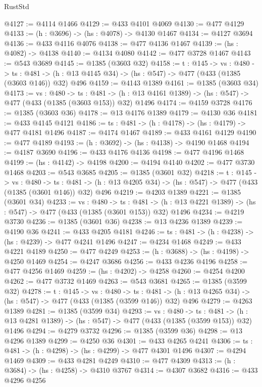 \begin{lexlean}{RustStd}
\begin{coremodule}
@4127 := @4114 @1466
@4129 := @433 @4101 @4069
@4130 := @477 @4129
@4133 := (h : @3696) -> (hs : @4078) -> @4130 @1467
@4134 := @4127 @3694
@4136 := @433 @4116 @4076
@4138 := @477 @4136 @1467
@4139 := (hs : @4082) -> @4138
@4140 := @4134 @4080
@4142 := @477 @3728 @1467
@4143 := @543 @3689
@4145 := @1385 (@3603 @32)
@4158 := {t : @145} ->
  {vs : @480} ->
  {ts : @481} -> (h : @13 @4145 @34) -> (hs : @547) -> @477 (@433 (@1385 (@3603 @146)) @32) @496
@4159 := @4143 @1389
@4161 := @1385 (@3603 @34)
@4173 := {vs : @480} ->
  {ts : @481} -> (h : @13 @4161 @1389) -> (hs : @547) -> @477 (@433 (@1385 (@3603 @153)) @32) @1496
@4174 := @4159 @3728
@4176 := @1385 (@3603 @36)
@4178 := @13 @4176 @1389
@4179 := @4130 @36
@4181 := @433 @4145 @4121
@4186 := {ts : @481} -> (h : @4178) -> (hs : @4179) -> @477 @4181 @1496
@4187 := @4174 @1467
@4189 := @433 @4161 @4129
@4190 := @477 @4189
@4193 := (h : @3692) -> (hs : @4138) -> @4190 @1468
@4194 := @4187 @3690
@4196 := @433 @4176 @4136
@4198 := @477 @4196 @1468
@4199 := (hs : @4142) -> @4198
@4200 := @4194 @4140
@4202 := @477 @3730 @1468
@4203 := @543 @3685
@4205 := @1385 (@3601 @32)
@4218 := {t : @145} ->
  {vs : @480} ->
  {ts : @481} -> (h : @13 @4205 @34) -> (hs : @547) -> @477 (@433 (@1385 (@3601 @146)) @32) @496
@4219 := @4203 @1389
@4221 := @1385 (@3601 @34)
@4233 := {vs : @480} ->
  {ts : @481} -> (h : @13 @4221 @1389) -> (hs : @547) -> @477 (@433 (@1385 (@3601 @153)) @32) @1496
@4234 := @4219 @3730
@4236 := @1385 (@3601 @36)
@4238 := @13 @4236 @1389
@4239 := @4190 @36
@4241 := @433 @4205 @4181
@4246 := {ts : @481} -> (h : @4238) -> (hs : @4239) -> @477 @4241 @1496
@4247 := @4234 @1468
@4249 := @433 @4221 @4189
@4250 := @477 @4249
@4253 := (h : @3688) -> (hs : @4198) -> @4250 @1469
@4254 := @4247 @3686
@4256 := @433 @4236 @4196
@4258 := @477 @4256 @1469
@4259 := (hs : @4202) -> @4258
@4260 := @4254 @4200
@4262 := @477 @3732 @1469
@4263 := @543 @3681
@4265 := @1385 (@3599 @32)
@4278 := {t : @145} ->
  {vs : @480} ->
  {ts : @481} -> (h : @13 @4265 @34) -> (hs : @547) -> @477 (@433 (@1385 (@3599 @146)) @32) @496
@4279 := @4263 @1389
@4281 := @1385 (@3599 @34)
@4293 := {vs : @480} ->
  {ts : @481} -> (h : @13 @4281 @1389) -> (hs : @547) -> @477 (@433 (@1385 (@3599 @153)) @32) @1496
@4294 := @4279 @3732
@4296 := @1385 (@3599 @36)
@4298 := @13 @4296 @1389
@4299 := @4250 @36
@4301 := @433 @4265 @4241
@4306 := {ts : @481} -> (h : @4298) -> (hs : @4299) -> @477 @4301 @1496
@4307 := @4294 @1469
@4309 := @433 @4281 @4249
@4310 := @477 @4309
@4313 := (h : @3684) -> (hs : @4258) -> @4310 @3767
@4314 := @4307 @3682
@4316 := @433 @4296 @4256

\end{coremodule}
\end{lexlean}
